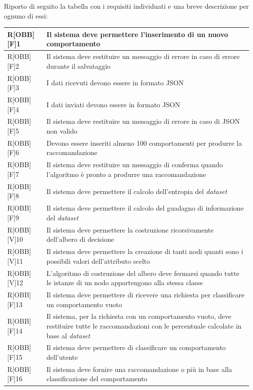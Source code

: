 \newpage
Riporto di seguito la tabella con i requisiti individuati e una breve descrizione per ognuno di essi:
\begin{table}[h]
	\begin{tabular}{|p{}|p{}|}
		\midrule
		R[OBB][F]1 & Il sistema deve permettere l'inserimento di un nuovo comportamento \\ \midrule
		R[OBB][F]2 & Il sistema deve restituire un messaggio di errore in caso di errore durante il salvataggio \\ \midrule
		R[OBB][F]3 & I dati ricevuti devono essere in formato \gls{JSON} \\ \midrule
		R[OBB][F]4 & I dati inviati devono essere in formato \gls{JSON} \\ \midrule
		R[OBB][F]5 & Il sistema deve restituire un messaggio di errore in caso di \gls{JSON} non valido \\ \midrule
		R[OBB][F]6 & Devono essere inseriti almeno 100 comportamenti per produrre la raccomandazione \\ \midrule
		R[OBB][F]7 & Il sistema deve restituire un messaggio di conferma quando l'algoritmo è pronto a produrre una raccomandazione \\ \midrule
		R[OBB][F]8 & Il sistema deve permettere il calcolo dell'entropia del \textit{dataset} \\ \midrule
		R[OBB][F]9 & Il sistema deve permettere il calcolo del guadagno di informazione del \textit{dataset} \\ \midrule
		R[OBB][V]10 & Il sistema deve permettere la costruzione ricorsivamente dell'albero di decisione \\ \midrule
		R[OBB][V]11 & Il sistema deve permettere la creazione di tanti nodi quanti sono i possibili valori dell'attributo scelto \\ \midrule
		R[OBB][V]12 & L'algoritmo di costruzione del albero deve fermarsi quando tutte le istanze di un nodo appartengono alla stessa classe \\ \midrule
		R[OBB][F]13 & Il sistema deve permettere di ricevere una richiesta per classificare un comportamento vuoto \\ \midrule
		R[OBB][F]14 & Il sistema, per la richiesta con un comportamento vuoto, deve restituire tutte le raccomandazioni con le percentuale calcolate in base al \textit{dataset} \\ \midrule
		R[OBB][F]15 & Il sistema deve permettere di classificare un comportamento dell'utente \\ \midrule
		R[OBB][F]16 & Il sistema deve fornire una raccomandazione o più in base alla classificazione del comportamento \\ \midrule	
		\bottomrule
		
	\end{tabular}
\end{table}
		
